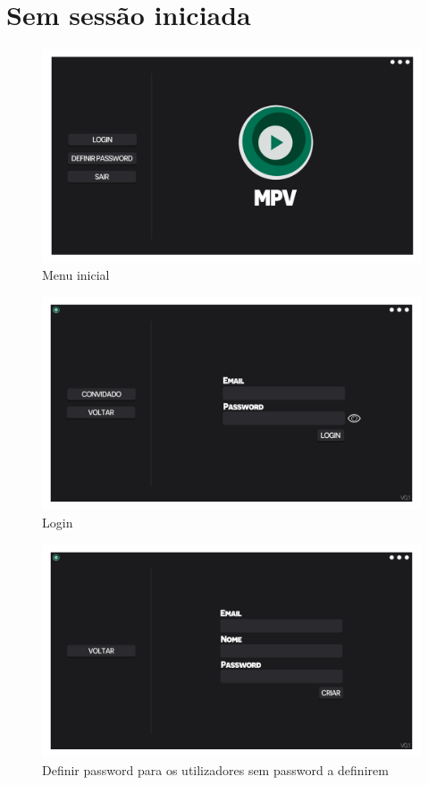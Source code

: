 \documentclass[a4paper]{report}
\begin{document}
\section{Sem sessão iniciada}
\begin{figure}[H]
	\centering 
    \includegraphics[width=\textwidth]{images/Inicio_Menu.png}  
    \caption{Menu inicial}
\end{figure}

\begin{figure}[H]
	\centering 
    \includegraphics[width=\textwidth]{images/Login_Menu.png}  
    \caption{Login}
\end{figure}

\begin{figure}[H]
	\centering 
    \includegraphics[width=\textwidth]{images/DefinirPassword_Menu.png}  
    \caption{Definir password para os utilizadores sem password a definirem}
\end{figure}
\end{document}
